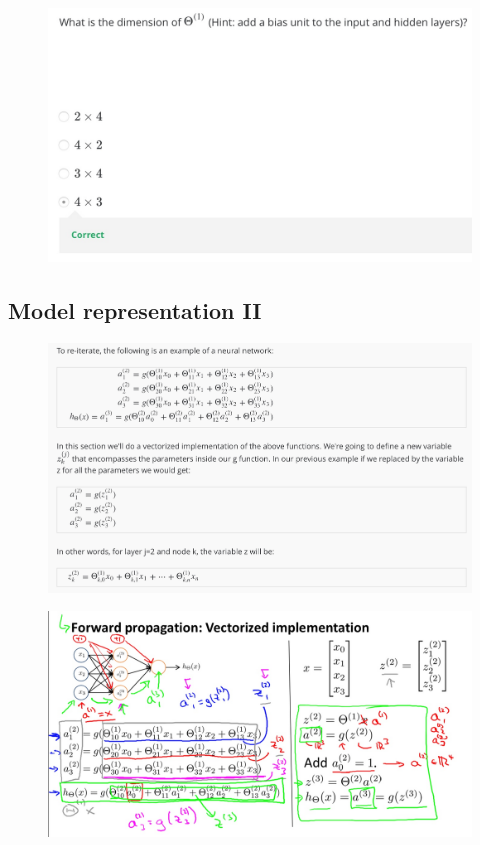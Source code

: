 \documentclass[12pt, A4,onecolumn]{article} %
\begin{document}
\begin{figure}[H]
	\centering
	\includegraphics[width=1\textwidth]{./ImagenesW4/testmrep1_2}
\end{figure}


\subsection{Model representation II}
\begin{figure}[H]
	\centering
	\includegraphics[width=1\textwidth]{./ImagenesW4/modelRep6}
\end{figure}

\begin{figure}[H]
	\centering
	\includegraphics[width=1\textwidth]{./ImagenesW4/forwardProp1}
\end{figure}
\end{document}
